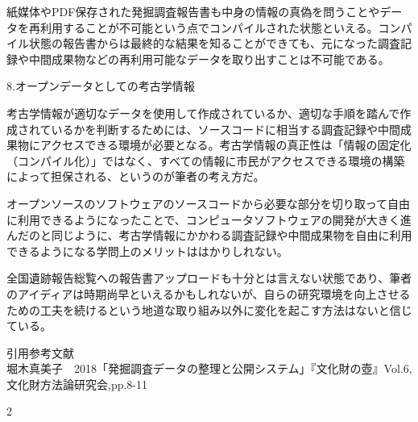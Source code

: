 \documentclass[9pt,b5j,papersize]{jsarticle}
\begin{document}
\begin{multicols}{2}
紙媒体やPDF保存された発掘調査報告書も中身の情報の真偽を問うことやデータを再利用することが不可能という点でコンパイルされた状態といえる。コンパイル状態の報告書からは最終的な結果を知ることができても、元になった調査記録や中間成果物などの再利用可能なデータを取り出すことは不可能である。


\noindent
{\large 8.オープンデータとしての考古学情報}

考古学情報が適切なデータを使用して作成されているか、適切な手順を踏んで作成されているかを判断するためには、ソースコードに相当する調査記録や中間成果物にアクセスできる環境が必要となる。考古学情報の真正性は「情報の固定化（コンパイル化）」ではなく、すべての情報に市民がアクセスできる環境の構築によって担保される、というのが筆者の考え方だ。

オープンソースのソフトウェアのソースコードから必要な部分を切り取って自由に利用できるようになったことで、コンピュータソフトウェアの開発が大きく進んだのと同じように、考古学情報にかかわる調査記録や中間成果物を自由に利用できるようになる学問上のメリットははかりしれない。

全国遺跡報告総覧への報告書アップロードも十分とは言えない状態であり、筆者のアイディアは時期尚早といえるかもしれないが、自らの研究環境を向上させるための工夫を続けるという地道な取り組み以外に変化を起こす方法はないと信じている。


\vspace{1\baselineskip}
\noindent
引用参考文献\\
堀木真美子　2018「発掘調査データの整理と公開システム」『文化財の壺』Vol.6,文化財方法論研究会,pp.8-11
\end{multicols}{2}
\end{document}
